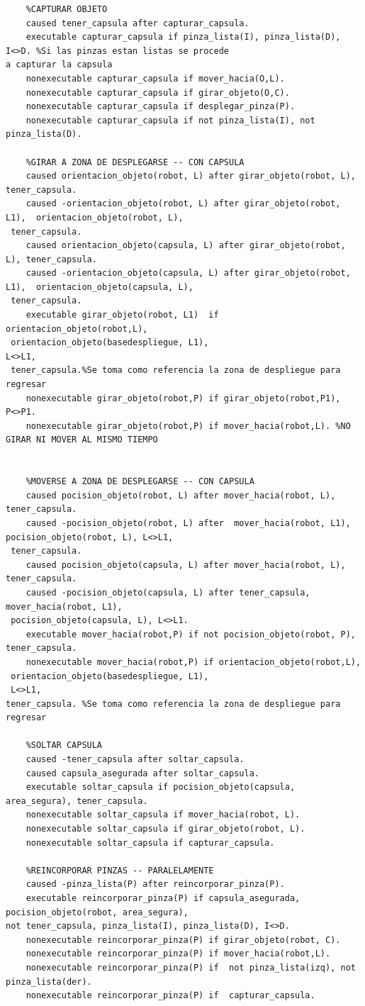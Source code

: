\documentclass[letterpaper ,10pt]{article}
\begin{document}
{{{{{{\begin{lstlisting}
	%CAPTURAR OBJETO
	caused tener_capsula after capturar_capsula.
	executable capturar_capsula if pinza_lista(I), pinza_lista(D), I<>D. %Si las pinzas estan listas se procede 
a capturar la capsula
	nonexecutable capturar_capsula if mover_hacia(O,L).
	nonexecutable capturar_capsula if girar_objeto(O,C).
	nonexecutable capturar_capsula if desplegar_pinza(P).
	nonexecutable capturar_capsula if not pinza_lista(I), not pinza_lista(D).
	
	%GIRAR A ZONA DE DESPLEGARSE -- CON CAPSULA
	caused orientacion_objeto(robot, L) after girar_objeto(robot, L), tener_capsula.
	caused -orientacion_objeto(robot, L) after girar_objeto(robot, L1),  orientacion_objeto(robot, L),
 tener_capsula.
	caused orientacion_objeto(capsula, L) after girar_objeto(robot, L), tener_capsula.
	caused -orientacion_objeto(capsula, L) after girar_objeto(robot, L1),  orientacion_objeto(capsula, L),
 tener_capsula.
	executable girar_objeto(robot, L1)	if orientacion_objeto(robot,L),
 orientacion_objeto(basedespliegue, L1), 
L<>L1,
 tener_capsula.%Se toma como referencia la zona de despliegue para regresar
	nonexecutable girar_objeto(robot,P) if girar_objeto(robot,P1), P<>P1.
	nonexecutable girar_objeto(robot,P) if mover_hacia(robot,L). %NO GIRAR NI MOVER AL MISMO TIEMPO
	
	
	%MOVERSE A ZONA DE DESPLEGARSE -- CON CAPSULA
	caused pocision_objeto(robot, L) after mover_hacia(robot, L), tener_capsula.
	caused -pocision_objeto(robot, L) after  mover_hacia(robot, L1), pocision_objeto(robot, L), L<>L1,
 tener_capsula.
	caused pocision_objeto(capsula, L) after mover_hacia(robot, L), tener_capsula.
	caused -pocision_objeto(capsula, L) after tener_capsula, mover_hacia(robot, L1), 
 pocision_objeto(capsula, L), L<>L1.
	executable mover_hacia(robot,P) if not pocision_objeto(robot, P),  tener_capsula. 
	nonexecutable mover_hacia(robot,P) if orientacion_objeto(robot,L),
 orientacion_objeto(basedespliegue, L1),
 L<>L1, 
tener_capsula. %Se toma como referencia la zona de despliegue para regresar

	%SOLTAR CAPSULA
	caused -tener_capsula after soltar_capsula.
	caused capsula_asegurada after soltar_capsula.
	executable soltar_capsula if pocision_objeto(capsula, area_segura), tener_capsula.
	nonexecutable soltar_capsula if mover_hacia(robot, L).
	nonexecutable soltar_capsula if girar_objeto(robot, L).
	nonexecutable soltar_capsula if capturar_capsula.
	
	%REINCORPORAR PINZAS -- PARALELAMENTE
	caused -pinza_lista(P) after reincorporar_pinza(P).
	executable reincorporar_pinza(P) if capsula_asegurada, pocision_objeto(robot, area_segura), 
not tener_capsula, pinza_lista(I), pinza_lista(D), I<>D.
	nonexecutable reincorporar_pinza(P) if girar_objeto(robot, C).
	nonexecutable reincorporar_pinza(P) if mover_hacia(robot,L).
	nonexecutable reincorporar_pinza(P) if  not pinza_lista(izq), not pinza_lista(der).
	nonexecutable reincorporar_pinza(P) if  capturar_capsula.
	

\end{lstlisting}}}}}}}
\end{document}

